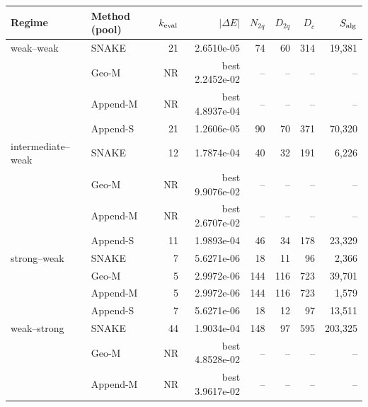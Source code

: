 \documentclass[
  reprint,
  amsmath,
  amssymb,
  aps,
  pra,
  nofootinbib,
  superscriptaddress,
  floatfix
]{revtex4-2}
\begin{document}
\noindent\begin{minipage}{\textwidth}
\begin{center}
\label{tab:hh_fixed_accuracy_first_hit}
\scriptsize
\setlength{\tabcolsep}{3.0pt}
\renewcommand{\arraystretch}{0.94}
\begin{tabular}{@{}llrrrrrr@{}}
\toprule
Regime & Method (pool) & $k_{\rm eval}$ & \(\lvert\Delta E\rvert\) & $N_{2q}$ & $D_{2q}$ & $D_c$ & $S_{\rm alg}$ \\
\midrule
weak--weak & SNAKE & 21 & 2.6510e-05 & 74 & 60 & 314 & 19,381 \\
 & Geo-M & NR & best 2.2452e-02 & -- & -- & -- & -- \\
 & Append-M & NR & best 4.8937e-04 & -- & -- & -- & -- \\
 & Append-S & 21 & 1.2606e-05 & 90 & 70 & 371 & 70,320 \\
\addlinespace[1.5pt]
intermediate--weak & SNAKE & 12 & 1.7874e-04 & 40 & 32 & 191 & 6,226 \\
 & Geo-M & NR & best 9.9076e-02 & -- & -- & -- & -- \\
 & Append-M & NR & best 2.6707e-02 & -- & -- & -- & -- \\
 & Append-S & 11 & 1.9893e-04 & 46 & 34 & 178 & 23,329 \\
\addlinespace[1.5pt]
strong--weak & SNAKE & 7 & 5.6271e-06 & 18 & 11 & 96 & 2,366 \\
 & Geo-M & 5 & 2.9972e-06 & 144 & 116 & 723 & 39,701 \\
 & Append-M & 5 & 2.9972e-06 & 144 & 116 & 723 & 1,579 \\
 & Append-S & 7 & 5.6271e-06 & 18 & 12 & 97 & 13,511 \\
\midrule
weak--strong & SNAKE & 44 & 1.9034e-04 & 148 & 97 & 595 & 203,325 \\
 & Geo-M & NR & best 4.8528e-02 & -- & -- & -- & -- \\
 & Append-M & NR & best 3.9617e-02 & -- & -- & -- & -- \\

\end{tabular}
\end{center}
\end{minipage}
\end{document}
